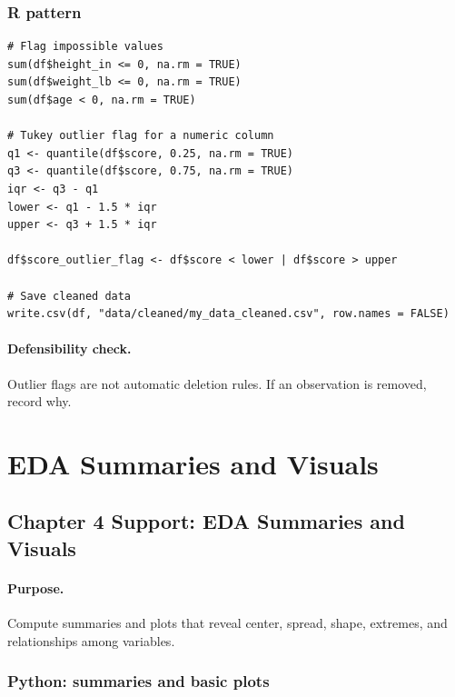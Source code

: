 \subsubsection*{R pattern}

\begin{verbatim}
# Flag impossible values
sum(df$height_in <= 0, na.rm = TRUE)
sum(df$weight_lb <= 0, na.rm = TRUE)
sum(df$age < 0, na.rm = TRUE)

# Tukey outlier flag for a numeric column
q1 <- quantile(df$score, 0.25, na.rm = TRUE)
q3 <- quantile(df$score, 0.75, na.rm = TRUE)
iqr <- q3 - q1
lower <- q1 - 1.5 * iqr
upper <- q3 + 1.5 * iqr

df$score_outlier_flag <- df$score < lower | df$score > upper

# Save cleaned data
write.csv(df, "data/cleaned/my_data_cleaned.csv", row.names = FALSE)
\end{verbatim}

\paragraph{Defensibility check.} Outlier flags are not automatic deletion rules.  If an observation is removed, record why.

\section{EDA Summaries and Visuals}
\label{app:cookbook-eda-data-quality}

\subsection{Chapter 4 Support: EDA Summaries and Visuals}
\label{app:ch04-software-cookbook-eda-patterns}

\paragraph{Purpose.} Compute summaries and plots that reveal center, spread, shape, extremes, and relationships among variables.

\subsubsection*{Python: summaries and basic plots}

